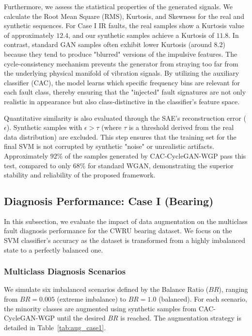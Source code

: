 Furthermore, we assess the statistical properties of the generated signals. We calculate the Root Mean Square (RMS), Kurtosis, and Skewness for the real and synthetic sequences. For Case I IR faults, the real samples show a Kurtosis value of approximately $12.4$, and our synthetic samples achieve a Kurtosis of $11.8$. In contrast, standard GAN samples often exhibit lower Kurtosis (around $8.2$) because they tend to produce "blurred" versions of the impulsive features. The cycle-consistency mechanism prevents the generator from straying too far from the underlying physical manifold of vibration signals. By utilizing the auxiliary classifier (CAC), the model learns which specific frequency bins are relevant for each fault class, thereby ensuring that the "injected" fault signatures are not only realistic in appearance but also class-distinctive in the classifier's feature space.

Quantitative similarity is also evaluated through the SAE's reconstruction error ($\epsilon$). Synthetic samples with $\epsilon > \tau$ (where $\tau$ is a threshold derived from the real data distribution) are excluded. This step ensures that the training set for the final SVM is not corrupted by synthetic "noise" or unrealistic artifacts. Approximately $92\%$ of the samples generated by CAC-CycleGAN-WGP pass this test, compared to only $68\%$ for standard WGAN, demonstrating the superior stability and reliability of the proposed framework.

\subsection{Diagnosis Performance: Case I (Bearing)}
In this subsection, we evaluate the impact of data augmentation on the multiclass fault diagnosis performance for the CWRU bearing dataset. We focus on the SVM classifier's accuracy as the dataset is transformed from a highly imbalanced state to a perfectly balanced one.

\subsubsection{Multiclass Diagnosis Scenarios}
We simulate six imbalanced scenarios defined by the Balance Ratio ($BR$), ranging from $BR=0.005$ (extreme imbalance) to $BR=1.0$ (balanced). For each scenario, the minority classes are augmented using synthetic samples from CAC-CycleGAN-WGP until the desired $BR$ is reached. The augmentation strategy is detailed in Table~\ref{tab:aug_case1}.

